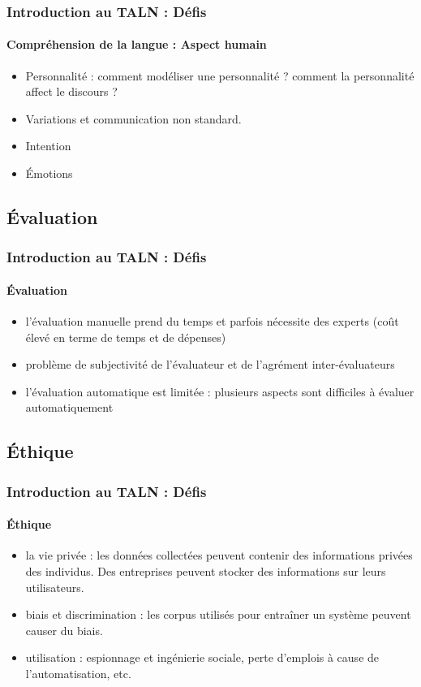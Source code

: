 \documentclass[xcolor=table]{beamer}
\begin{document}
\begin{frame}
\frametitle{Introduction au TALN : Défis}
\framesubtitle{Compréhension de la langue : Aspect humain}

\begin{itemize}
	\item Personnalité : comment modéliser une personnalité ? comment la personnalité affect le discours ?
	\item Variations et communication non standard. 
	\item Intention 
	\item Émotions 
\end{itemize}

\end{frame}


\subsection{Évaluation}

\begin{frame}
\frametitle{Introduction au TALN : Défis}
\framesubtitle{Évaluation}

\begin{itemize}
	\item l'évaluation manuelle prend du temps et parfois nécessite des experts (coût élevé en terme de temps et de dépenses)
	\item problème de subjectivité de l'évaluateur et de l'agrément inter-évaluateurs
	\item l'évaluation automatique est limitée : plusieurs aspects sont difficiles à évaluer automatiquement
\end{itemize}

\end{frame}

\subsection{Éthique}

\begin{frame}
\frametitle{Introduction au TALN : Défis}
\framesubtitle{Éthique}

\begin{itemize}
	\item la vie privée : les données collectées peuvent contenir des informations privées des individus. Des entreprises peuvent stocker des informations sur leurs utilisateurs. 
	\item biais et discrimination : les corpus utilisés pour entraîner un système peuvent causer du biais.
	\item utilisation : espionnage et ingénierie sociale, perte d'emplois à cause de l'automatisation, etc.
\end{itemize}

\end{frame}

\end{document}
